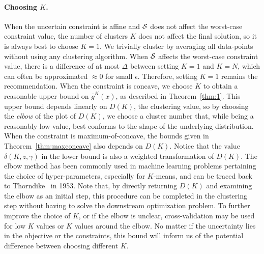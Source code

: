 \documentclass[12pt]{article}
\theoremstyle{thmstyleone}%
\theoremstyle{thmstyletwo}%
\theoremstyle{thmstylethree}%
\newcommand{\reviewChanges}{}
\begin{document}
\paragraph{Choosing $K$.}
When the uncertain constraint is affine and $\mathcal{S}$ does not affect the worst-case constraint value, the number of clusters $K$ does not affect the final solution, so it is always best to choose $K = 1$.
We trivially cluster by averaging all data-points without using any clustering algorithm.
When $\mathcal{S}$ affects the worst-case constraint value, there is a difference of at most $\Delta$ between setting $K=1$ and $K=N$, which can often be approximated $\approx 0$ for small $\epsilon$. Therefore, setting $K = 1$ remains the recommendation.
When the constraint is concave, we choose $K$ to obtain a reasonable upper bound on $\bar{g}^K(x)$, as described in Theorem~\ref{thm:1}.
This upper bound depends linearly on $D(K)$, the clustering value, so by choosing the {\it elbow} of the plot of $D(K)$, we choose a cluster number that, while being a reasonably low value, best conforms to the shape of the underlying distribution.
\reviewChanges{When the constraint is maximum-of-concave, the bounds given in Theorem~\ref{thm:maxconcave} also depends on $D(K)$. Notice that the value $\delta(K,z,\gamma)$ in the lower bound is also a weighted transformation of $D(K)$.}
The elbow method has been commonly used in machine learning problems pertaining the choice of hyper-parameters, especially for $K$-means, and can be traced back to Thorndike~\cite{elbow} in 1953.
Note that, by directly returning $D(K)$ and examining the elbow as an initial step, this procedure can be completed in the clustering step without having to solve the downstream optimization problem.
\reviewChanges{To further improve the choice of $K$, or if the elbow is unclear, cross-validation may be used for low $K$ values or $K$ values around the elbow. }
No matter if the uncertainty lies in the objective or the constraints, this bound will inform us of the potential difference between choosing different $K$.
\end{document}
